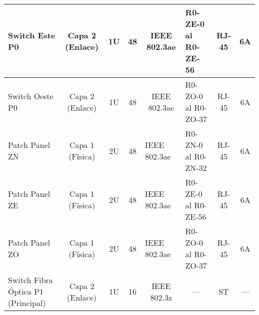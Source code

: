 \begin{table}[h]
{\begin{tabular}{|l|c|c|c|clcc}
Switch Este P0                     & Capa 2 (Enlace)                        & 1U                                   & 48                                       & \multicolumn{1}{c|}{IEEE 802.3ae}      & \multicolumn{1}{l|}{R0-ZE-0 al R0-ZE-56}                                                                                     & \multicolumn{1}{c|}{RJ-45}                  & \multicolumn{1}{c|}{6A}                 \\ \hline
Switch Oeste P0                    & Capa 2 (Enlace)                        & 1U                                   & 48                                       & \multicolumn{1}{c|}{IEEE 802.3ae}      & \multicolumn{1}{l|}{R0-ZO-0 al R0-ZO-37}                                                                                     & \multicolumn{1}{c|}{RJ-45}                  & \multicolumn{1}{c|}{6A}                 \\ \hline
Patch Panel ZN                     & Capa 1 (Física)                        & 2U                                   & 48                                       & \multicolumn{1}{l|}{IEEE 802.3ae}      & \multicolumn{1}{l|}{R0-ZN-0 al R0-ZN-32}                                                                                     & \multicolumn{1}{c|}{RJ-45}                  & \multicolumn{1}{c|}{6A}                 \\ \hline
Patch Panel ZE                     & Capa 1 (Física)                        & 2U                                   & 48                                       & \multicolumn{1}{l|}{IEEE 802.3ae}      & \multicolumn{1}{l|}{R0-ZE-0 al R0-ZE-56}                                                                                     & \multicolumn{1}{c|}{RJ-45}                  & \multicolumn{1}{c|}{6A}                 \\ \hline
Patch Panel ZO                     & Capa 1 (Física)                        & 2U                                   & 48                                       & \multicolumn{1}{l|}{IEEE 802.3ae}      & \multicolumn{1}{l|}{R0-ZO-0 al R0-ZO-37}                                                                                     & \multicolumn{1}{c|}{RJ-45}                  & \multicolumn{1}{c|}{6A}                 \\ \hline
Switch Fibra Óptica P1 (Principal) & Capa 2 (Enlace)                        & 1U                                   & 16                                       & \multicolumn{1}{c|}{IEEE 802.3z}       & \multicolumn{1}{c|}{---}                                                                                                     & \multicolumn{1}{c|}{ST}                     & \multicolumn{1}{c|}{---}                \\ \hline

\end{tabular}}
\end{table}
